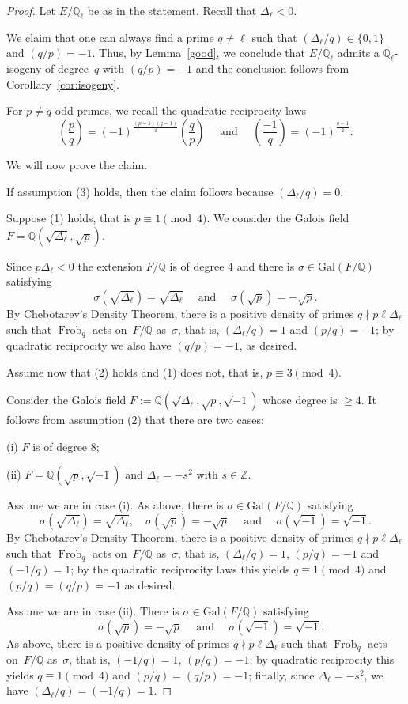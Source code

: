 \documentclass[12pt]{amsart}
\numberwithin{equation}{section}
\theoremstyle{definition}
\newcommand{\Q}{\mathbb{Q}}
\newcommand{\Z}{\mathbb{Z}}
\newcommand{\Gal}{\text{Gal}}
\DeclareMathOperator{\Frob}{Frob}
\begin{document}
\begin{proof}
Let $E/\Q_\ell$ be as in the statement.
Recall that $\Delta_{\ell} < 0$. 

We claim that  one can always find a prime $q \neq \ell$ such that $(\Delta_{\ell}/q) \in \{0,1\}$ and $(q/p)=-1$. Thus, by
Lemma~\ref{good}, we conclude that $E/\Q_\ell$ admits
a $\Q_\ell$-isogeny of degree~$q$ with $(q/p)=-1$ and the conclusion follows from Corollary~\ref{cor:isogeny}.

For $p \neq q$ odd primes, we
recall the quadratic reciprocity laws
\[
 \left(\frac{p}{q}\right)=(-1)^{\frac{(p-1)(q-1)}{4}} \left(\frac{q}{p}\right) \quad \text{ and } \quad \left(\frac{-1}{q}\right) = (-1)^{\frac{q-1}{2}}.
\]

We will now prove the claim. 

If assumption (3) holds, then the claim follows because $(\Delta_\ell / q) = 0$.

Suppose (1) holds, that is  $p \equiv 1 \pmod{4}$. We consider the Galois field $F=\Q(\sqrt{\Delta_{\ell}},\sqrt{p})$.

Since $p\Delta_{\ell}<0$ the extension $F/\Q$ is of degree 4  and there is $\sigma \in \Gal(F/\Q)$ satisfying
\[ \sigma(\sqrt{\Delta_\ell}) = \sqrt{\Delta_\ell}
 \quad \text{ and } \quad \sigma(\sqrt{p}) = - \sqrt{p}.
\] 
By Chebotarev's Density Theorem, there is a positive density of primes $q \nmid p\ell \Delta_\ell$ such that $\Frob_q$ acts on~$F/\Q$ as~$\sigma$, that is, $(\Delta_{\ell}/q)=1$ and $(p/q)=-1$; by quadratic reciprocity we also have $(q/p)= -1$, as desired.

Assume now that (2) holds and (1) does not, that is, $p \equiv 3 \pmod{4}$.

Consider the Galois field $F:=\Q(\sqrt{\Delta_{\ell}},\sqrt{p}, \sqrt{-1})$ whose degree is $\geq 4$.
It follows from assumption (2) that there are two cases:

(i) $F$ is of degree 8;

(ii) $F=\Q(\sqrt{p}, \sqrt{-1})$ and
$\Delta_\ell = - s^2$ with $s \in \Z$.

Assume we are in case (i). As above, there is $\sigma \in \Gal(F/\Q)$ satisfying
\[ \sigma(\sqrt{\Delta_\ell}) = \sqrt{\Delta_\ell},
\quad \sigma(\sqrt{p}) = - \sqrt{p}  \quad \text{ and } \quad  \sigma(\sqrt{-1}) =   \sqrt{-1}.
\]
By Chebotarev's Density Theorem, there is a positive density of primes $q \nmid p \ell \Delta_\ell$ such that $\Frob_q$ acts on~$F/\Q$ as~$\sigma$, that is, $(\Delta_{\ell}/q)=1$, $(p/q)=-1$ and $(-1/q) = 1$; by the quadratic reciprocity laws this yields $q \equiv 1 \pmod 4$ and $(p/q)=(q/p) = -1$ as desired.
 
Assume we are in case (ii). There is $\sigma \in \Gal(F/\Q)$ satisfying
\[
\quad \sigma(\sqrt{p}) = - \sqrt{p}  \quad \text{ and } \quad  \sigma(\sqrt{-1}) =   \sqrt{-1}.
\]
As above, there is a positive density of primes $q \nmid p \ell \Delta_\ell$ such that $\Frob_q$ acts on~$F/\Q$ as~$\sigma$, that is, $(-1/q)=1$, $(p/q)=-1$; by quadratic reciprocity this yields $q \equiv 1 \pmod 4$ and $(p/q)=(q/p) = -1$; finally,
since $\Delta_\ell = - s^2$, we have $(\Delta_\ell/q) = (-1/q) = 1$.
\end{proof}
\end{document}
